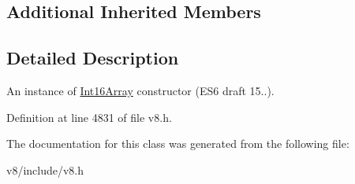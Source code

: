 \subsection*{Additional Inherited Members}


\subsection{Detailed Description}
An instance of \mbox{\hyperlink{classv8_1_1Int16Array}{Int16\+Array}} constructor (E\+S6 draft 15..). 

Definition at line 4831 of file v8.\+h.



The documentation for this class was generated from the following file\+:\begin{DoxyCompactItemize}
\item 
v8/include/v8.\+h\end{DoxyCompactItemize}
